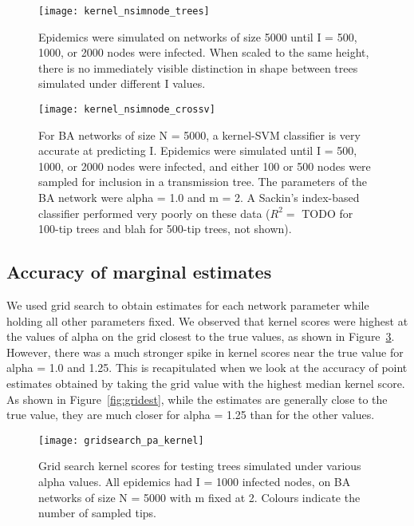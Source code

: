 \begin{figure}[ht]
  \centering
  \label{fig:prevtrees}
  \texttt{[image: kernel\_nsimnode\_trees]}
  \caption[Similarly shaped simulated under three values of \gls{I}]{
    Epidemics were simulated on networks of size 5000 until \gls{I} = 500,
    1000, or 2000 nodes were infected. When scaled to the same height, there is
    no immediately visible distinction in shape between trees simulated under
    different \gls{I} values.
  }
\end{figure}

\begin{figure}[ht]
  \centering
  \label{fig:prevcrossv}
  \texttt{[image: kernel\_nsimnode\_crossv]}
  \caption[Cross-validation performance of kernel-\gls{SVM} classifier for
           prevalence]{
    For \gls{BA} networks of size \gls{N} = 5000, a kernel-\gls{SVM} classifier
    is very accurate at predicting \gls{I}. Epidemics were simulated until
    \gls{I} = 500, 1000, or 2000 nodes were infected, and either 100 or 500
    nodes were sampled for inclusion in a transmission tree. The parameters of
    the \gls{BA} network were \gls{alpha} = 1.0 and \gls{m} = 2. A Sackin's
    index-based classifier performed very poorly on these data ($R^2 = $ TODO
    for 100-tip trees and blah for 500-tip trees, not shown).
  }
\end{figure}

\subsection{Accuracy of marginal estimates}

We used grid search to obtain  estimates for each network
parameter while holding all other parameters fixed. We observed that kernel
scores were highest at the values of \gls{alpha} on the grid closest to the
true values, as shown in Figure~\ref{fig:gridkernel}. However, there was a much
stronger spike in kernel scores near the true value for \gls{alpha} = 1.0 and
1.25. This is recapitulated when we look at the accuracy of point estimates
obtained by taking the grid value with the highest median kernel score. As
shown in Figure~\ref{fig:gridest}, while the estimates are generally close to
the true value, they are much closer for \gls{alpha} = 1.25 than for the other
values.

\begin{figure}[ht]
  \centering
  \texttt{[image: gridsearch\_pa\_kernel]}
  \caption[Grid search kernel scores]{
    Grid search kernel scores for testing trees simulated under various
    \gls{alpha} values. All epidemics had \gls{I} = 1000 infected nodes, on
    \gls{BA} networks of size \gls{N} = 5000 with \gls{m} fixed at 2. Colours
    indicate the number of sampled tips.
  }
  \label{fig:gridkernel}
\end{figure}

